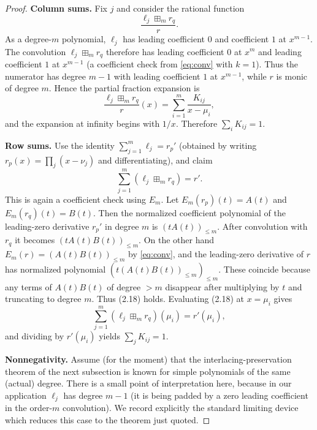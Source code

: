 \documentclass{article}
\begin{document}
\begin{proof}
\textbf{Column sums.} Fix $j$ and consider the rational function
\[
  \frac{\ell_j \boxplus_m r_q}{r}.
\]
As a degree-$m$ polynomial, $\ell_j$ has leading coefficient $0$ and coefficient $1$ at $x^{m-1}$. The convolution $\ell_j \boxplus_m r_q$ therefore has leading coefficient $0$ at $x^m$ and leading coefficient $1$ at $x^{m-1}$ (a coefficient check from \eqref{eq:conv} with $k=1$). Thus the numerator has degree $m-1$ with leading coefficient $1$ at $x^{m-1}$, while $r$ is monic of degree $m$. Hence the partial fraction expansion is
\[
  \frac{\ell_j \boxplus_m r_q}{r}(x) = \sum_{i=1}^m \frac{K_{ij}}{x - \mu_i},
\]
and the expansion at infinity begins with $1/x$. Therefore $\sum_i K_{ij} = 1$.

\textbf{Row sums.} Use the identity $\sum_{j=1}^m \ell_j = r_p'$ (obtained by writing $r_p(x) = \prod_j(x-\nu_j)$ and differentiating), and claim
\begin{equation}
  \sum_{j=1}^m (\ell_j \boxplus_m r_q) = r'. \tag{2.18}
\end{equation}
This is again a coefficient check using $E_m$. Let $E_m(r_p)(t) = A(t)$ and $E_m(r_q)(t) = B(t)$. Then the normalized coefficient polynomial of the leading-zero derivative $r_p'$ in degree $m$ is $(tA(t))_{\le m}$. After convolution with $r_q$ it becomes $(tA(t)B(t))_{\le m}$. On the other hand $E_m(r) = (A(t)B(t))_{\le m}$ by \eqref{eq:conv}, and the leading-zero derivative of $r$ has normalized polynomial $(t(A(t)B(t))_{\le m})_{\le m}$. These coincide because any terms of $A(t)B(t)$ of degree $> m$ disappear after multiplying by $t$ and truncating to degree $m$. Thus (2.18) holds. Evaluating (2.18) at $x = \mu_i$ gives
\[
  \sum_{j=1}^m (\ell_j \boxplus_m r_q)(\mu_i) = r'(\mu_i),
\]
and dividing by $r'(\mu_i)$ yields $\sum_j K_{ij} = 1$.

\textbf{Nonnegativity.} Assume (for the moment) that the interlacing-preservation theorem of the next subsection is known for simple polynomials of the same (actual) degree. There is a small point of interpretation here, because in our application $\ell_j$ has degree $m-1$ (it is being padded by a zero leading coefficient in the order-$m$ convolution). We record explicitly the standard limiting device which reduces this case to the theorem just quoted.


\end{proof}
\end{document}

